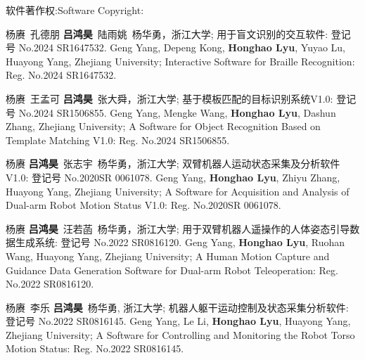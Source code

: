 \resumePOR{}
    {\ifchinese 软件著作权:\else Software Copyright:\fi}
    {}
\resumeItemListStart
\begin{enumerate}[align=left, widest={[\textbf{S.1}]}, itemindent=0em, label={\textbf{[\arabic*]}]}]
    \item[\textbf{[S.5]}] \ifchinese
        杨赓\ 孔德朋 \textbf{吕鸿昊}\ 陆雨姚\ 杨华勇，浙江大学; 用于盲文识别的交互软件: 登记号 No.2024 SR1647532.
    \else
        Geng Yang, Depeng Kong, \textbf{Honghao Lyu}, Yuyao Lu, Huayong Yang, Zhejiang University; Interactive Software for Braille Recognition: Reg. No.2024 SR1647532.
    \fi
    \item[\textbf{[S.4]}] \ifchinese
        杨赓\ 王孟可 \textbf{吕鸿昊}\ 张大舜，浙江大学; 基于模板匹配的目标识别系统V1.0: 登记号 No.2024 SR1506855.
    \else
        Geng Yang, Mengke Wang, \textbf{Honghao Lyu}, Dashun Zhang, Zhejiang University; A Software for Object Recognition Based on Template Matching V1.0: Reg. No.2024 SR1506855.
    \fi
    \item[\textbf{[S.3]}] \ifchinese
        杨赓 \textbf{吕鸿昊}\ 张志宇\ 杨华勇，浙江大学; 双臂机器人运动状态采集及分析软件V1.0: 登记号 No.2020SR 0061078.
    \else
        Geng Yang, \textbf{Honghao Lyu}, Zhiyu Zhang, Huayong Yang, Zhejiang University; A Software for Acquisition and Analysis of Dual-arm Robot Motion Status V1.0: Reg. No.2020SR 0061078.
    \fi
    \item[\textbf{[S.2]}] \ifchinese
        杨赓 \textbf{吕鸿昊}\ 汪若菡\ 杨华勇，浙江大学; 用于双臂机器人遥操作的人体姿态引导数据生成系统: 登记号 No.2022 SR0816120.
    \else
        Geng Yang, \textbf{Honghao Lyu}, Ruohan Wang, Huayong Yang, Zhejiang University; A Human Motion Capture and Guidance Data Generation Software for Dual-arm Robot Teleoperation: Reg. No.2022 SR0816120.
    \fi
    \item[\textbf{[S.1]}] \ifchinese
        杨赓\ 李乐 \textbf{吕鸿昊}\ 杨华勇, 浙江大学; 机器人躯干运动控制及状态采集分析软件: 登记号 No.2022 SR0816145.
    \else
        Geng Yang, Le Li, \textbf{Honghao Lyu}, Huayong Yang, Zhejiang University; A Software for Controlling and Monitoring the Robot Torso Motion Status: Reg. No.2022 SR0816145.
    \fi
\end{enumerate}
\resumeItemListEnd
